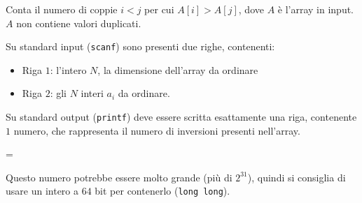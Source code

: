 \usepackage{xcolor}
\usepackage{afterpage}
\usepackage{pifont,mdframed}
\usepackage[bottom]{footmisc}


\renewcommand{\inputfile}{\texttt{stdin}}
\renewcommand{\outputfile}{\texttt{stdout}}
\makeatletter
\renewcommand{\this@inputfilename}{\texttt{stdin}}
\renewcommand{\this@outputfilename}{\texttt{stdout}}
\makeatother


\newenvironment{warning}
  {\par\begin{mdframed}[linewidth=2pt,linecolor=gray]%
    \begin{list}{}{\leftmargin=1cm
                   \labelwidth=\leftmargin}\item[\Large\ding{43}]}
  {\end{list}\end{mdframed}\par}


    Conta il numero di coppie $i < j$ per cui $A[i] > A[j]$, dove $A$ è l'array in input.
    $A$ non contiene valori duplicati.



\InputFile
Su standard input (\texttt{scanf}) sono presenti due righe, contenenti:
\begin{itemize}[nolistsep,itemsep=2mm]
\item Riga $1$: l'intero $N$, la dimensione dell'array da ordinare
\item Riga $2$: gli $N$ interi $a_i$ da ordinare.
\end{itemize}

\OutputFile
Su standard output (\texttt{printf}) deve essere scritta esattamente una riga,
contenente $1$ numero, che rappresenta il numero di inversioni presenti nell'array.

\begin{warning}
  Questo numero potrebbe essere molto grande (più di $2^{31}$), quindi si consiglia
    di usare un intero a $64$ bit per contenerlo (\texttt{long long}).
\end{warning}
	


